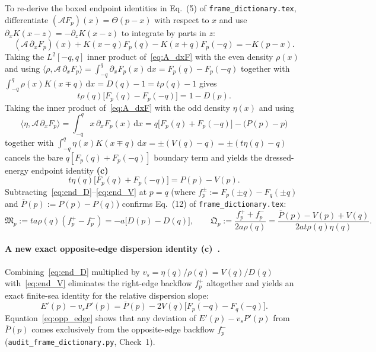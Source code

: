 \documentclass[11pt,a4paper]{article}
\newcommand{\Lc}{\textsf{\textbf{(c)}}\ }
\newcommand{\scr}{\texttt{audit\_\allowbreak frame\_\allowbreak dictionary.py}}
\newcommand{\dd}{\mathrm d}
\begin{document}
To re-derive the boxed endpoint identities in Eq.~(5) of
\texttt{frame\_\allowbreak dictionary.tex}, differentiate
$(\mathcal AF_p)(x)=\Theta(p-x)$ with respect to $x$ and use
$\partial_x K(x-z)=-\partial_z K(x-z)$ to integrate by parts in $z$:
\begin{equation}\label{eq:A_dxF}
 (\mathcal A\,\partial_x F_p)(x)+K(x-q)F_p(q)-K(x+q)F_p(-q)=-K(p-x).
\end{equation}
Taking the $L^2[-q,q]$ inner product of~\eqref{eq:A_dxF} with the even density
$\rho(x)$ and using $\langle\rho,\mathcal A\,\partial_x F_p\rangle
=\int_{-q}^q\partial_x F_p(x)\,\dd x=F_p(q)-F_p(-q)$ together with
$\int_{-q}^q\rho(x)K(x\mp q)\,\dd x=D(q)-1=t\rho(q)-1$ gives
\begin{equation}\label{eq:end_D}
 t\rho(q)\big[F_p(q)-F_p(-q)\big]=1-D(p).
\end{equation}
Taking the inner product of~\eqref{eq:A_dxF} with the odd density $\eta(x)$ and
using
\[
 \langle\eta,\mathcal A\,\partial_x F_p\rangle=\int_{-q}^q x\,\partial_x F_p(x)\,\dd x
 =q\big[F_p(q)+F_p(-q)\big]-\big(P(p)-p\big)
\]
together with $\int_{-q}^q\eta(x)K(x\mp q)\,\dd x=\pm(V(q)-q)=\pm(t\eta(q)-q)$
cancels the bare $q[F_p(q)+F_p(-q)]$ boundary term and yields the dressed-energy
endpoint identity \Lc
\begin{equation}\label{eq:end_V}
 t\eta(q)\big[F_p(q)+F_p(-q)\big]=P(p)-V(p).
\end{equation}
Subtracting~\eqref{eq:end_D}--\eqref{eq:end_V} at $p=q$ (where $f_p^\pm:=F_p(\pm q)-F_q(\pm q)$
and $\overline P(p):=P(p)-P(q)$) confirms Eq.~(12) of
\texttt{frame\_\allowbreak dictionary.tex}:
\begin{equation}\label{eq:MQ_deriv}
 \mathfrak M_p:=ta\rho(q)(f_p^+-f_p^-)=-a\big[D(p)-D(q)\big],\qquad
 \mathfrak Q_p:=\frac{f_p^++f_p^-}{2a\rho(q)}=\frac{\overline P(p)-V(p)+V(q)}{2at\rho(q)\eta(q)}.
\end{equation}

\paragraph{A new exact opposite-edge dispersion identity \Lc.}
Combining~\eqref{eq:end_D} multiplied by $v_s=\eta(q)/\rho(q)=V(q)/D(q)$ with~\eqref{eq:end_V}
eliminates the right-edge backflow $f_p^+$ altogether and yields an exact finite-sea
identity for the relative dispersion slope:
\begin{equation}\label{eq:opp_edge}
 \boxed{E'(p)-v_s P'(p)=\overline P(p)-2V(q)\big[F_p(-q)-F_q(-q)\big].}
\end{equation}
Equation~\eqref{eq:opp_edge} shows that any deviation of $E'(p)-v_s P'(p)$ from
$\overline P(p)$ comes exclusively from the opposite-edge backflow $f_p^-$
(\scr, Check~1).
\end{document}
